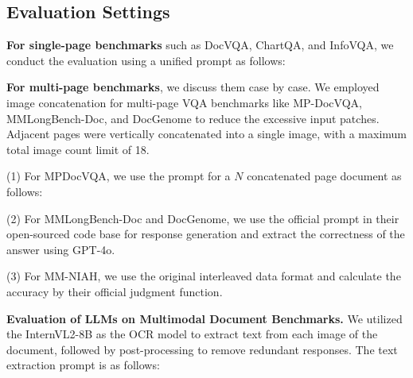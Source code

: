 \subsection{Evaluation Settings}

\textbf{For single-page benchmarks} such as DocVQA, ChartQA, and InfoVQA, we conduct the evaluation using a unified prompt as follows:



\noindent\textbf{For multi-page benchmarks}, we discuss them case by case. We employed image concatenation for multi-page VQA benchmarks like MP-DocVQA, MMLongBench-Doc, and DocGenome to reduce the excessive input patches. Adjacent pages were vertically concatenated into a single image, with a maximum total image count limit of 18.

(1) For MPDocVQA, we use the prompt for a $N$ concatenated page document as follows:


(2) For MMLongBench-Doc and DocGenome, we use the official prompt in their open-sourced code base for response generation and extract the correctness of the answer using GPT-4o.

(3) For MM-NIAH, we use the original interleaved data format and calculate the accuracy by their official judgment function.

\noindent\textbf{Evaluation of LLMs on Multimodal Document Benchmarks.}
We utilized the InternVL2-8B as the OCR model to extract text from each image of the document, followed by post-processing to remove redundant responses. The text extraction prompt is as follows:


